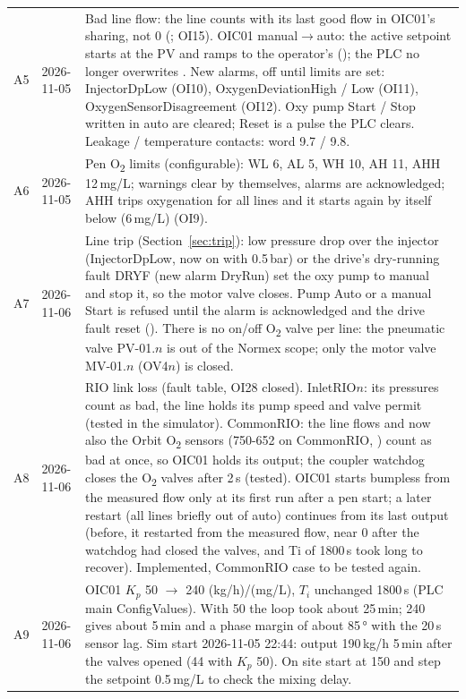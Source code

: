 \documentclass[11pt,a4paper]{article}
\newcommand{\Otwo}{O\textsubscript{2}}
\begin{document}
\begin{small}
\begin{tabularx}{\textwidth}{@{}P{10mm}P{22mm}L@{}}
A5 & 2026-11-05 & Bad line flow: the line counts with its last good flow in OIC01's sharing, not 0 (; OI15). OIC01 manual$\to$auto: the active setpoint starts at the PV and ramps to the operator's (); the PLC no longer overwrites . New alarms, off until limits are set: InjectorDpLow (OI10), OxygenDeviationHigh / Low (OI11), OxygenSensorDisagreement (OI12). Oxy pump Start / Stop written in auto are cleared; Reset is a pulse the PLC clears. Leakage / temperature contacts: word 9.7 / 9.8. \\
A6 & 2026-11-05 & Pen \Otwo{} limits (configurable): WL 6, AL 5, WH 10, AH 11, AHH 12\,mg/L; warnings clear by themselves, alarms are acknowledged; AHH trips oxygenation for all lines and it starts again by itself below  (6\,mg/L) (OI9). \\
A7 & 2026-11-06 & Line trip (Section~\ref{sec:trip}): low pressure drop over the injector (InjectorDpLow, now on with 0.5\,bar) or the drive's dry-running fault DRYF (new alarm DryRun) set the oxy pump to manual and stop it, so the motor valve closes. Pump Auto or a manual Start is refused until the alarm is acknowledged and the drive fault reset (). There is no on/off \Otwo{} valve per line: the pneumatic valve PV-01.$n$ is out of the Normex scope; only the motor valve MV-01.$n$ (OV4$n$) is closed. \\
A8 & 2026-11-06 & RIO link loss (fault table, OI28 closed). InletRIO$n$: its pressures count as bad, the line holds its pump speed and valve permit (tested in the simulator). CommonRIO: the line flows and now also the Orbit \Otwo{} sensors (750-652 on CommonRIO, ) count as bad at once, so OIC01 holds its output; the coupler watchdog closes the \Otwo{} valves after 2\,s (tested). OIC01 starts bumpless from the measured flow only at its first run after a pen start; a later restart (all lines briefly out of auto) continues from its last output (before, it restarted from the measured flow, near 0 after the watchdog had closed the valves, and Ti of 1800\,s took long to recover). Implemented, CommonRIO case to be tested again. \\
A9 & 2026-11-06 & OIC01 $K_p$ 50 $\to$ 240 (kg/h)/(mg/L), $T_i$ unchanged 1800\,s (PLC main ConfigValues). With 50 the loop took about 25\,min; 240 gives about 5\,min and a phase margin of about 85\,° with the 20\,s sensor lag. Sim start 2026-11-05 22:44: output 190\,kg/h 5\,min after the valves opened (44 with $K_p$ 50). On site start at 150 and step the setpoint 0.5\,mg/L to check the mixing delay. \\
\end{tabularx}
\end{small}
\end{document}

